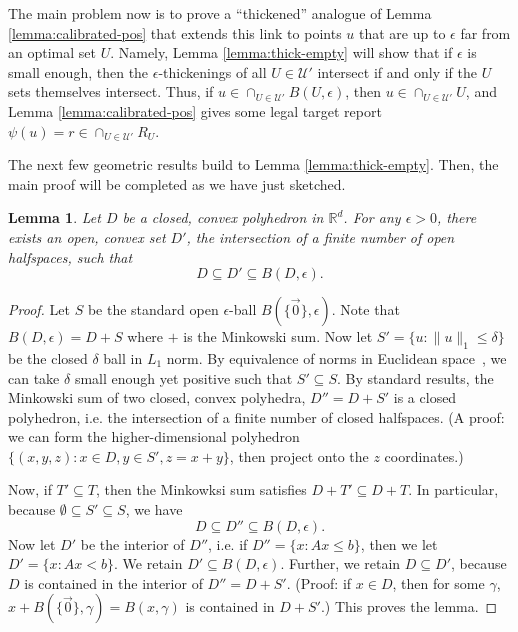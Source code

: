 \documentclass[11pt]{article}
\newcommand{\Comments}{1}
\newcommand{\mynote}[2]{\ifnum\Comments=1\textcolor{#1}{#2}\fi}
\newcommand{\bo}[1]{\mynote{blue}{[Bo: #1]}}
\newcommand{\reals}{\mathbb{R}}
\newcommand{\U}{\mathcal{U}}
\newtheorem{lemma}{Lemma}
\begin{document}
The main problem now is to prove a ``thickened'' analogue of Lemma \ref{lemma:calibrated-pos} that extends this link to points $u$ that are up to $\epsilon$ far from an optimal set $U$.
Namely, Lemma \ref{lemma:thick-empty} will show that if $\epsilon$ is small enough, then the $\epsilon$-thickenings of all $U \in \U'$ intersect if and only if the $U$ sets themselves intersect.
Thus, if $u \in \cap_{U \in \U'} B(U,\epsilon)$, then $u \in \cap_{U \in \U'} U$, and Lemma \ref{lemma:calibrated-pos} gives some legal target report $\psi(u) = r \in \cap_{U \in \U'} R_U$.

The next few geometric results build to Lemma \ref{lemma:thick-empty}.
Then, the main proof will be completed as we have just sketched.

\begin{lemma} \label{lemma:enclose-halfspaces}
  Let $D$ be a closed, convex polyhedron in $\reals^d$.
  For any $\epsilon > 0$, there exists an \emph{open}, convex set $D'$, the intersection of a finite number of open halfspaces, such that
    \[ D \subseteq D' \subseteq B(D,\epsilon) . \]
\end{lemma}
\begin{proof}
  Let $S$ be the standard open $\epsilon$-ball $B(\{\vec{0}\},\epsilon)$.
  Note that $B(D,\epsilon) = D + S$ where $+$ is the Minkowski sum.
  Now let $S' = \{u : \|u\|_1 \leq \delta\}$ be the closed $\delta$ ball in $L_1$ norm.
  By equivalence of norms in Euclidean space~\cite[Appendix A.1.4]{boyd2004convex}, we can take $\delta$ small enough yet positive such that $S' \subseteq S$.
  By standard results, the Minkowski sum of two closed, convex polyhedra, $D'' = D + S'$ is a closed polyhedron, i.e. the intersection of a finite number of closed halfspaces. (A proof: we can form the higher-dimensional polyhedron $\{(x,y,z) : x \in D, y \in S', z = x+y\}$, then project onto the $z$ coordinates.)

  Now, if $T' \subseteq T$, then the Minkowksi sum satisfies $D + T' \subseteq D + T$.
  In particular, because $\emptyset \subseteq S' \subseteq S$, we have
    \[ D \subseteq D'' \subseteq B(D,\epsilon) . \]
  Now let $D'$ be the interior of $D''$, i.e. if $D'' = \{x : Ax \leq b\}$, then we let $D' = \{x: Ax < b\}$.
  We retain $D' \subseteq B(D,\epsilon)$.
  Further, we retain $D \subseteq D'$, because $D$ is contained in the interior of $D'' = D + S'$.
  (Proof: if $x \in D$, then for some $\gamma$, $x + B(\{\vec{0}\},\gamma) = B(x,\gamma)$ is contained in $D + S'$.)
  This proves the lemma.
\end{proof}
\end{document}
